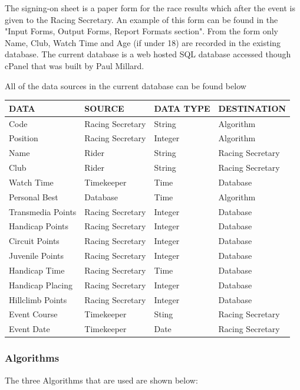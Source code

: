 The signing-on sheet is a paper form for the race results which after the event is given to the Racing Secretary. An example of this form can be found  in the "Input Forms, Output Forms, Report Formats section". From the form only Name, Club, Watch Time and Age (if under 18) are recorded in the existing database. The current database is a web hosted SQL database accessed though cPanel that was built by Paul Millard. 

All of the data sources in the current database can be found below

\begin{tabular}{|l|l|l|l|}

\hline
DATA & SOURCE & DATA TYPE & DESTINATION \\ \hline
Code & Racing Secretary & String & Algorithm \\ \hline
Position & Racing Secretary & Integer & Algorithm \\ \hline
Name & Rider & String & Racing Secretary \\ \hline
Club & Rider & String & Racing Secretary \\ \hline
Watch Time & Timekeeper & Time & Database \\ \hline
Personal Best & Database & Time & Algorithm \\ \hline
Transmedia Points & Racing Secretary & Integer & Database \\ \hline
Handicap Points & Racing Secretary & Integer & Database \\ \hline
Circuit Points & Racing Secretary & Integer & Database \\ \hline
Juvenile Points & Racing Secretary & Integer & Database \\ \hline
Handicap Time & Racing Secretary & Time & Database \\ \hline
Handicap Placing & Racing Secretary & Integer & Database \\ \hline
Hillclimb Points & Racing Secretary & Integer & Database \\ \hline
Event Course & Timekeeper & Sting & Racing Secretary \\ \hline
Event Date & Timekeeper & Date & Racing Secretary \\ \hline

\end{tabular}

\subsubsection{Algorithms}
The three Algorithms that are used are shown below:

